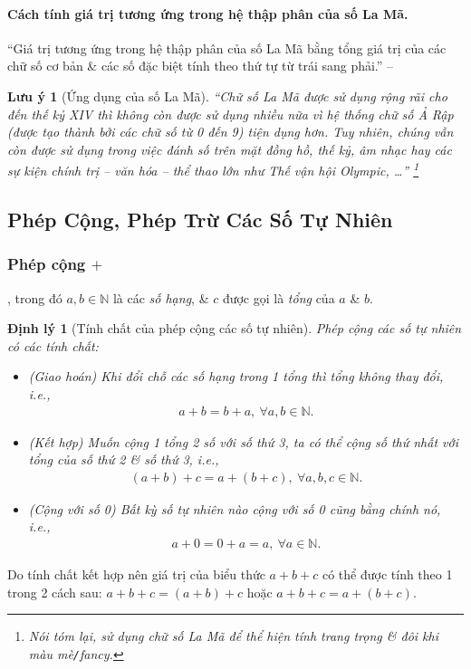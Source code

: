 \documentclass{article}
\numberwithin{equation}{section}
\newtheorem{theorem}{Định lý}[section]
\newtheorem{remark}{Lưu ý}[section]
\begin{document}
\paragraph{Cách tính giá trị tương ứng trong hệ thập phân của số La Mã.} ``Giá trị tương ứng trong hệ thập phân của số La Mã bằng tổng giá trị của các chữ số cơ bản \& các số đặc biệt tính theo thứ tự từ trái sang phải.'' -- \cite[p. 14]{Toan6}

\begin{remark}[Ứng dụng của số La Mã]
	``Chữ số La Mã được sử dụng rộng rãi cho đến thế kỷ XIV thì không còn được sử dụng nhiều nữa vì hệ thống chữ số Ả Rập (được tạo thành bởi các chữ số từ 0 đến 9) tiện dụng hơn. Tuy nhiên, chúng vẫn còn được sử dụng trong việc đánh số trên mặt đồng hồ, thế kỷ, âm nhạc hay các sự kiện chính trị -- văn hóa -- thể thao lớn như Thế vận hội Olympic, \ldots'' \footnote{Nói tóm lại, sử dụng chữ số La Mã để thể hiện tính trang trọng \& đôi khi màu mè\texttt{/}fancy.}
\end{remark}

\subsection{Phép Cộng, Phép Trừ Các Số Tự Nhiên}

\subsubsection{Phép cộng $+$}
, trong đó $a,b\in\mathbb{N}$ là các \textit{số hạng}, \& $c$ được gọi là \textit{tổng} của $a$ \& $b$.

\begin{theorem}[Tính chất của phép cộng các số tự nhiên]
	Phép cộng các số tự nhiên có các tính chất:
	\begin{itemize}
		\item (Giao hoán) Khi đổi chỗ các số hạng trong 1 tổng thì tổng không thay đổi, i.e.,
		\begin{align*}
			a + b = b + a,\ \forall a,b\in\mathbb{N}.
		\end{align*}
		\item (Kết hợp) Muốn cộng 1 tổng 2 số với số thứ 3, ta có thể cộng số thứ nhất với tổng của số thứ 2 \& số thứ 3, i.e.,
		\begin{align*}
			(a + b) + c = a +(b + c),\ \forall a,b,c\in\mathbb{N}.
		\end{align*}
		\item (Cộng với số 0) Bất kỳ số tự nhiên nào cộng với số 0 cũng bằng chính nó, i.e.,
		\begin{align*}
			a + 0 = 0 + a = a,\ \forall a\in\mathbb{N}.
		\end{align*}
	\end{itemize}
\end{theorem}
Do tính chất kết hợp nên giá trị của biểu thức $a + b + c$ có thể được tính theo 1 trong 2 cách sau: $a + b + c = (a + b) + c$ hoặc $a + b + c = a + (b + c)$.
\end{document}
